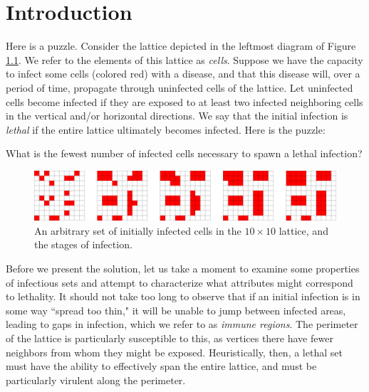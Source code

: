 \chapter{Introduction}

Here is a puzzle. Consider the lattice depicted in the leftmost diagram of Figure \ref{fig:simple_puzzle}. We refer to the elements of this lattice as \emph{cells}. Suppose we have the capacity to infect some cells (colored red) with a disease, and that this disease will, over a period of time, propagate through uninfected cells of the lattice. Let uninfected cells become infected if they are exposed to at least two infected neighboring cells in the vertical and/or horizontal directions. We say that the initial infection is \emph{lethal} if the entire lattice ultimately becomes infected. Here is the puzzle:

\begin{question}
\label{que:simple_puzzle}
What is the fewest number of infected cells necessary to spawn a lethal infection?
\end{question}

\begin{figure}[]
\centering
\includegraphics[width=\textwidth]{figures/1/simple_puzzle.pdf}
\caption{An arbitrary set of initially infected cells in the $10 \times 10$ lattice, and the stages of infection.}
\label{fig:simple_puzzle}
\end{figure} 

Before we present the solution,
let us take a moment to examine some properties of infectious sets and attempt to characterize what attributes might correspond to lethality. It should not take too long to observe that if an initial infection is in some way ``spread too thin," it will be unable to jump between infected areas, leading to gaps in infection, which we refer to as \emph{immune regions}. The perimeter of the lattice is particularly susceptible to this, as vertices there have fewer neighbors from whom they might be exposed. Heuristically, then, a lethal set must have the ability to effectively span the entire lattice, and must be particularly virulent along the perimeter. 

